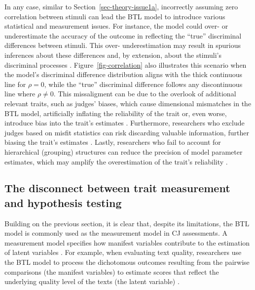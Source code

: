 \documentclass[
  authoryear,
  preprint,
  1p]{elsarticle}
\begin{document}
{In any case, similar to Section~\ref{sec-theory-issue1a}, incorrectly
assuming zero correlation between stimuli can lead the BTL model to
introduce various statistical and measurement issues. For instance, the
model could over- or underestimate the accuracy of the outcome in
reflecting the ``true'' discriminal differences between stimuli. This
over- underestimation may result in spurious inferences about these
differences and, by extension, about the stimuli's discriminal processes
\citep[pp.~341]{Hoyle_et_al_2023}. Figure~\ref{fig-correlation} also
illustrates this scenario when the model's discriminal difference
distribution aligns with the thick continuous line for \(\rho=0\), while
the ``true'' discriminal difference follows any discontinuous line where
\(\rho \neq 0\). This missaligment can be due to the overlook of
additional relevant traits, such as judges' biases, which cause
dimensional mismatches in the BTL model, artificially inflating the
reliability of the trait \citep[pp.~341]{Hoyle_et_al_2023} or, even
worse, introduce bias into the trait's estimates \citep{Ackerman_1989}.
Furthermore, researchers who exclude judges based on misfit statistics
can risk discarding valuable information, further biasing the trait's
estimates \citep[chap.~12]{Zimmerman_1994, McElreath_2020}. Lastly,
researchers who fail to account for hierarchical (grouping) structures
can reduce the precision of model parameter estimates, which may amplify
the overestimation of the trait's reliability
\citep[pp.~482]{Hoyle_et_al_2023}.}

\subsection{The disconnect between trait measurement and hypothesis
testing}\label{sec-theory-issue2}

Building on the previous section, it is clear that, despite its
limitations, the BTL model is commonly used as the measurement model in
CJ assessments. A measurement model specifies how manifest variables
contribute to the estimation of latent variables
\citep{Everitt_et_al_2010}. For example, when evaluating text quality,
researchers use the BTL model to process the dichotomous outcomes
resulting from the pairwise comparisons (the manifest variables) to
estimate scores that reflect the underlying quality level of the texts
(the latent variable)
\citep{Laming_2004, Pollitt_2012b, Whitehouse_2012, vanDaal_et_al_2016, Lesterhuis_2018_thesis, Coertjens_et_al_2017, Goossens_et_al_2018, Bouwer_et_al_2023}.
\end{document}
